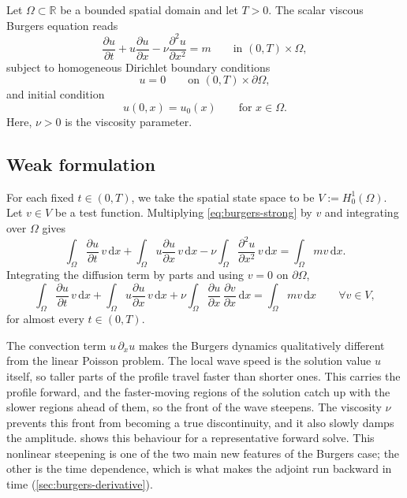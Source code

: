 \documentclass[a4paper,11pt]{article}
\newcommand{\R}{\mathbb{R}}
\newcommand{\Om}{\Omega}
\newcommand{\dom}{\partial\Omega}
\newcommand{\dx}{\,\mathrm{d}x}
\theoremstyle{spacedplain} \newtheorem{theorem}[counter]{Theorem} \newtheorem{lemma}[counter]{Lemma} \newtheorem{prop}[counter]{Proposition} \newtheorem{cor}[counter]{Corollary}
\theoremstyle{spaceddefinition} \newtheorem{defn}[counter]{Definition} \newtheorem{example}[counter]{Example} \newtheorem{remark}[counter]{Remark}
\begin{document}
Let $\Om \subset \R$ be a bounded spatial domain and let $T > 0$. The scalar viscous Burgers equation reads
\begin{equation}
  \label{eq:burgers-strong}
  \frac{\partial u}{\partial t}
  + u \frac{\partial u}{\partial x}
  - \nu \frac{\partial^{2} u}{\partial x^{2}} = m
  \qquad \text{in } (0, T) \times \Om,
\end{equation}
subject to homogeneous Dirichlet boundary conditions
\begin{equation}
  u = 0 \qquad \text{on } (0, T) \times \dom,
\end{equation}
and initial condition
\begin{equation}
  u(0, x) = u_0(x) \qquad \text{for } x \in \Om.
\end{equation}
Here, $\nu > 0$ is the viscosity parameter.

\subsection{Weak formulation}
\label{sec:burgers-weak:weak}

For each fixed $t \in (0, T)$, we take the spatial state space to be $V := H_0^1(\Om)$. Let $v \in V$ be a test function. Multiplying \cref{eq:burgers-strong} by $v$ and integrating over $\Om$ gives
\begin{equation}
  \int_{\Om} \frac{\partial u}{\partial t}\, v \dx
  + \int_{\Om} u \frac{\partial u}{\partial x}\, v \dx
  - \nu \int_{\Om} \frac{\partial^{2} u}{\partial x^{2}}\, v \dx
  = \int_{\Om} m v \dx.
\end{equation}
Integrating the diffusion term by parts and using $v = 0$ on $\dom$,
\begin{equation}
  \label{eq:burgers-weak}
  \int_{\Om} \frac{\partial u}{\partial t}\, v \dx
  + \int_{\Om} u \frac{\partial u}{\partial x}\, v \dx
  + \nu \int_{\Om} \frac{\partial u}{\partial x}\,
                   \frac{\partial v}{\partial x} \dx
  = \int_{\Om} m v \dx
  \qquad \forall v \in V,
\end{equation}
for almost every $t \in (0, T)$.

The convection term $u\,\partial_x u$ makes the Burgers dynamics qualitatively different from the linear Poisson problem. The local wave speed is the solution value $u$ itself, so taller parts of the profile travel faster than shorter ones. This carries the profile forward, and the faster-moving regions of the solution catch up with the slower regions ahead of them, so the front of the wave steepens. The viscosity $\nu$ prevents this front from becoming a true discontinuity, and it also slowly damps the amplitude.  shows this behaviour for a representative forward solve. This nonlinear steepening is one of the two main new features of the Burgers case; the other is the time dependence, which is what makes the adjoint run backward in time (\cref{sec:burgers-derivative}).
\end{document}
